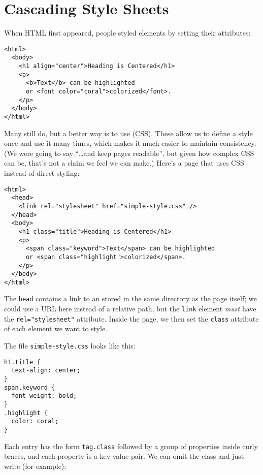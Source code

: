 \section{Cascading Style Sheets}\label{s:htmlcss-css}

When HTML first appeared, people styled elements by setting their attributes:

\begin{verbatim}
<html>
  <body>
    <h1 align="center">Heading is Centered</h1>
    <p>
      <b>Text</b> can be highlighted
      or <font color="coral">colorized</font>.
    </p>
  </body>
</html>
\end{verbatim}

Many still do,
but a better way is to use  (CSS).
These allow us to define a style once and use it many times,
which makes it much easier to maintain consistency.
(We were going to say ``{\ldots}and keep pages readable'',
but given how complex CSS can be,
that's not a claim we feel we can make.)
Here's a page that uses CSS instead of direct styling:

\begin{verbatim}
<html>
  <head>
    <link rel="stylesheet" href="simple-style.css" />
  </head>
  <body>
    <h1 class="title">Heading is Centered</h1>
    <p>
      <span class="keyword">Text</span> can be highlighted
      or <span class="highlight">colorized</span>.
    </p>
  </body>
</html>
\end{verbatim}

The \texttt{head} contains a link to an 
stored in the same directory as the page itself;
we could use a URL here instead of a relative path,
but the \texttt{link} element \emph{must} have the \texttt{rel="stylesheet"} attribute.
Inside the page,
we then set the \texttt{class} attribute of each element we want to style.

The file \texttt{simple-style.css} looks like this:

\begin{verbatim}
h1.title {
  text-align: center;
}
span.keyword {
  font-weight: bold;
}
.highlight {
  color: coral;
}
\end{verbatim}

\noindent
Each entry has the form \texttt{tag.class} followed by a group of properties inside curly braces,
and each property is a key-value pair.
We can omit the class and just write (for example):

